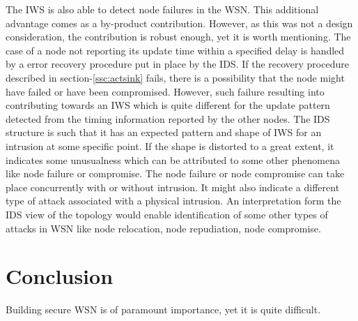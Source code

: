 \documentclass[conference,final]{IEEEtran}
\begin{document}
The IWS is also able to detect node failures in the WSN.
This additional advantage comes as a by-product contribution.
However, as this was not a design consideration, the contribution is robust enough, yet it is worth mentioning.
The case of a node not reporting its update time within a specified delay is handled by a error recovery procedure put in place by the IDS.
If the recovery procedure described in section-\ref{ssc:actsink} fails, there is a possibility that the node might have failed or have been compromised.
However, such failure resulting into contributing towards an IWS which is quite different for the update pattern detected from the timing information reported by the other nodes.
The IDS structure is such that it has an expected pattern and shape of IWS for an intrusion at some specific point.
If the shape is distorted to a great extent, it indicates some unusualness which can be attributed to some other phenomena like node failure or compromise.
The node failure or node compromise can take place concurrently with or without intrusion.
It might also indicate a different type of attack associated with a physical intrusion.
An interpretation form the IDS view of the topology would enable identification of some other types of attacks in WSN like node relocation, node repudiation, node compromise.





%
%
%




\section{Conclusion}
\label{sec:conc}
Building secure WSN is of paramount importance, yet it is quite difficult.
\end{document}
